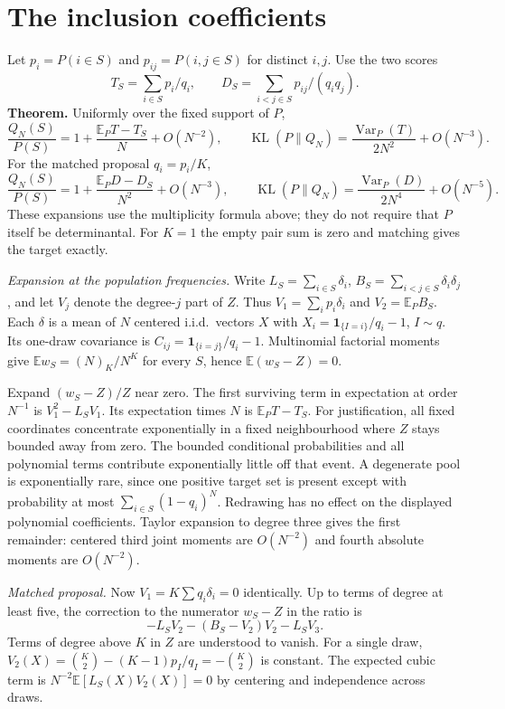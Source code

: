 \documentclass[11pt]{article}
\newcommand{\E}{\mathbb E}\newcommand{\Var}{\operatorname{Var}}\newcommand{\KL}{\operatorname{KL}}
\begin{document}
\newpage
\section{The inclusion coefficients}
Let $p_i=P(i\in S)$ and $p_{ij}=P(i,j\in S)$ for distinct $i,j$. Use the two scores
\[
 T_S=\sum_{i\in S}p_i/q_i,\qquad D_S=\sum_{i<j\in S}p_{ij}/(q_iq_j).
\]
\textbf{Theorem.} Uniformly over the fixed support of $P$,
\[
 \frac{Q_N(S)}{P(S)}=1+\frac{\E_P T-T_S}{N}+O(N^{-2}),\qquad
 \KL(P\|Q_N)=\frac{\Var_P(T)}{2N^2}+O(N^{-3}).
\]
For the matched proposal $q_i=p_i/K$,
\[
 \frac{Q_N(S)}{P(S)}=1+\frac{\E_P D-D_S}{N^2}+O(N^{-3}),\qquad
 \KL(P\|Q_N)=\frac{\Var_P(D)}{2N^4}+O(N^{-5}).
\]
These expansions use the multiplicity formula above; they do not require that $P$ itself be determinantal. For $K=1$ the empty pair sum is zero and matching gives the target exactly.

\textit{Expansion at the population frequencies.} Write $L_S=\sum_{i\in S}\delta_i$, $B_S=\sum_{i<j\in S}\delta_i\delta_j$, and let $V_j$ denote the degree-$j$ part of $Z$. Thus $V_1=\sum_i p_i\delta_i$ and $V_2=\E_P B_S$. Each $\delta$ is a mean of $N$ centered i.i.d.\ vectors $X$ with $X_i=\mathbf1_{\{I=i\}}/q_i-1$, $I\sim q$. Its one-draw covariance is $C_{ij}=\mathbf1_{\{i=j\}}/q_i-1$. Multinomial factorial moments give $\E w_S=(N)_K/N^K$ for every $S$, hence $\E(w_S-Z)=0$.

Expand $(w_S-Z)/Z$ near zero. The first surviving term in expectation at order $N^{-1}$ is $V_1^2-L_SV_1$. Its expectation times $N$ is $\E_P T-T_S$. For justification, all fixed coordinates concentrate exponentially in a fixed neighbourhood where $Z$ stays bounded away from zero. The bounded conditional probabilities and all polynomial terms contribute exponentially little off that event. A degenerate pool is exponentially rare, since one positive target set is present except with probability at most $\sum_{i\in S}(1-q_i)^N$. Redrawing has no effect on the displayed polynomial coefficients. Taylor expansion to degree three gives the first remainder: centered third joint moments are $O(N^{-2})$ and fourth absolute moments are $O(N^{-2})$.

\newpage
\textit{Matched proposal.} Now $V_1=K\sum q_i\delta_i=0$ identically. Up to terms of degree at least five, the correction to the numerator $w_S-Z$ in the ratio is
\[
       -L_S V_2 -(B_S-V_2)V_2 - L_S V_3 .
\]
Terms of degree above $K$ in $Z$ are understood to vanish. For a single draw, $V_2(X)=\binom K2-(K-1)p_I/q_I=-\binom K2$ is constant. The expected cubic term is $N^{-2}\E[L_S(X)V_2(X)]=0$ by centering and independence across draws.
\end{document}
